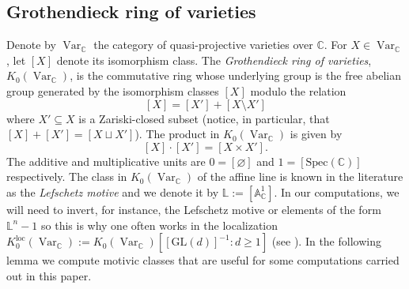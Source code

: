 \documentclass{amsart}
\theoremstyle{plain}
\numberwithin{equation}{section}
\theoremstyle{definition}
\theoremstyle{remark}
\begin{document}
	\subsection{Grothendieck ring of varieties}\label{GrothendieckRingOfVarieties}
	Denote by $\operatorname{Var}_{\mathbb{C}}$ the category of quasi-projective varieties over $\mathbb{C}$. For $X\in \operatorname{Var}_{\mathbb{C}}$, let $[X]$ denote its isomorphism class. The \emph{Grothendieck ring of varieties}, $K_0(\operatorname{Var}_{\mathbb{C}})$, is the commutative ring whose underlying group is the free abelian group generated by the isomorphism classes $[X]$ modulo the relation 
	$$
	[X]=[X']+[X\setminus X']
	$$ 
	where $X'\subseteq X$ is a Zariski-closed subset (notice, in particular, that $[X]+[X']=[X\sqcup X']$). The product in $K_0(\operatorname{Var}_{\mathbb{C}})$ is given by 
	$$
	[X]\cdot [X']=[X\times X'].
	$$
	The additive and multiplicative units are $0=[\varnothing]$ and $1=[\text{Spec}(\mathbb{C})]$ respectively. The class in $K_0(\operatorname{Var}_{\mathbb{C}})$ of the affine line is known in the literature as the \emph{Lefschetz motive} and we denote it by $\mathbb{L}:=[\mathbb{A}^1_{\mathbb{C}}]$. In our computations, we will need to invert, for instance, the Lefschetz motive or elements of the form $\mathbb{L}^n-1$ so this is why one often works in the localization $K_0^{\operatorname{loc}}(\operatorname{Var}_{\mathbb{C}}):=K_0(\operatorname{Var}_{\mathbb{C}})[[\text{GL}(d)]^{-1}:d\geq 1]$ (see \cite[Lemma 3.8]{BridgelandIntroMotivicHallAlgebras}). In the following lemma we compute motivic classes that are useful for some computations carried out in this paper. 
\end{document}
